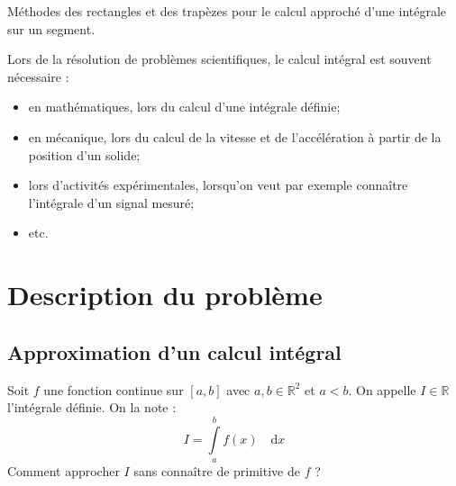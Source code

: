 \documentclass[10pt]{article}
\begin{document}
\begin{savoir}
Méthodes des rectangles et des trapèzes pour le calcul approché d’une intégrale sur un segment.
\end{savoir}

Lors de la résolution de problèmes scientifiques, le calcul intégral est souvent nécessaire :
\begin{itemize}
\item en mathématiques, lors du calcul d'une intégrale définie;
\item en mécanique, lors du calcul de la vitesse et de l'accélération à partir de la position d'un solide;
\item lors d'activités expérimentales, lorsqu'on veut par exemple connaître l'intégrale d'un signal mesuré;
\item etc.
\end{itemize}

\setlength{\parskip}{0ex plus 0.2ex minus 0ex}
 \renewcommand{\contentsname}{}
 \renewcommand{\baselinestretch}{1}

\tableofcontents

 \renewcommand{\baselinestretch}{1.2}
\setlength{\parskip}{2ex plus 0.5ex minus 0.2ex}


\section{Description du problème}
\subsection{Approximation d'un calcul intégral}
\begin{prob}
Soit $f$ une fonction continue sur $[a,b]$ avec $a,b \in \mathbb{R}^2$ et $a<b$. On appelle $I\in\mathbb{R}$ l'intégrale définie. On la note :
$$
I = \int\limits_{a}^b f(x) \quad \mathrm{d} x
$$
Comment approcher $I$ sans connaître de primitive de $f$ ?
\end{prob}
\end{document}
